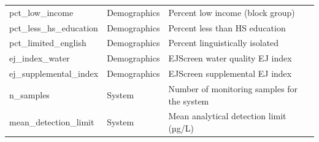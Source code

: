 \begin{table}
\begin{tabular}{lll}
pct_low_income & Demographics & Percent low income (block group) \\
pct_less_hs_education & Demographics & Percent less than HS education \\
pct_limited_english & Demographics & Percent linguistically isolated \\
ej_index_water & Demographics & EJScreen water quality EJ index \\
ej_supplemental_index & Demographics & EJScreen supplemental EJ index \\
n_samples & System & Number of monitoring samples for the system \\
mean_detection_limit & System & Mean analytical detection limit (µg/L) \\
\bottomrule
\end{tabular}
\end{table}
